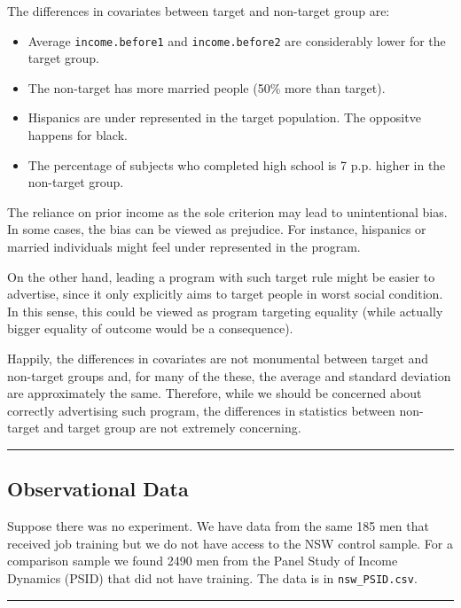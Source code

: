 \documentclass{article}
\newenvironment{colorparagraph}[1]{\par\color{#1}}{\par}
\begin{document}
The differences in covariates between target and non-target group are:
\begin{itemize}
    \item Average \texttt{income.before1} and \texttt{income.before2} are considerably lower for the target group.
    \item The non-target has more married people (50\% more than target).
    \item Hispanics are under represented in the target population. The oppositve happens for black.
    \item The percentage of subjects who completed high school is 7 p.p. higher in the non-target group.
\end{itemize}

The reliance on prior income as the sole criterion may lead to unintentional bias. In some cases, the bias can be viewed as prejudice. For instance, hispanics or married individuals might feel under represented in the program.

On the other hand, leading a program with such target rule might be easier to advertise, since it only explicitly aims to target people in worst social condition. In this sense, this could be viewed as program targeting equality (while actually bigger equality of outcome would be a consequence).

Happily, the differences in covariates are not monumental between target and non-target groups and, for many of the these, the average and standard deviation are approximately the same. Therefore, while we should be concerned about correctly advertising such program, the differences in statistics between non-target and target group are not extremely concerning.

\begin{colorparagraph}{questioncolor}
\rule{\textwidth}{0.5pt}

\label{q42}\subsection*{Observational Data}

Suppose there was no experiment. We have data from the same 185 men that received job training but we do not have access to the NSW control sample. For a comparison sample we found 2490 men from the Panel Study of Income Dynamics (PSID) that did not have training. The data is in \texttt{nsw\_PSID.csv}.

\rule{\textwidth}{0.5pt}
\end{colorparagraph}
\end{document}
